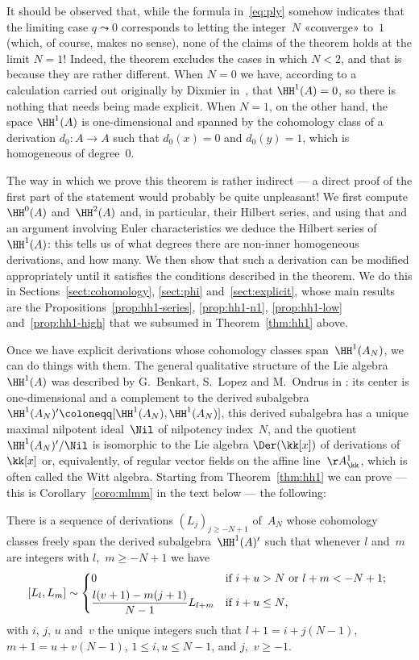 It should be observed that, while the formula in~\eqref{eq:ply} somehow
indicates that the limiting case $q\leadsto0$ corresponds to letting the
integer~$N$ «converge» to~$1$ (which, of course, makes no sense), none of
the claims of the theorem holds at the limit $N=1$! Indeed, the theorem
excludes the cases in which $N<2$, and that is because they are rather
different. When $N=0$ we have, according to a calculation carried out
originally by Dixmier in~\cite{Dixmier:2}, that $\HH^1(A)=0$, so there is
nothing that needs being made explicit. When $N=1$, on the other hand, the space
$\HH^1(A)$ is one-dimensional and spanned by the cohomology class of a
derivation $d_0:A\to A$ such that $d_0(x)=0$ and $d_0(y)=1$, which is
homogeneous of degree~$0$.

The way in which we prove this theorem is rather indirect --- a direct
proof of the first part of the statement would probably be quite
unpleasant! We first compute $\HH^0(A)$ and~$\HH^2(A)$ and, in particular,
their Hilbert series, and using that and an argument involving Euler
characteristics we deduce the Hilbert series of~$\HH^1(A)$: this tells us
of what degrees there are non-inner homogeneous derivations, and how many.
We then show that such a derivation can be modified appropriately until it
satisfies the conditions described in the theorem. We do this in
Sections~\ref{sect:cohomology}, \ref{sect:phi} and~\ref{sect:explicit},
whose main results are the Propositions~\ref{prop:hh1-series},
\ref{prop:hh1-n1}, \ref{prop:hh1-low} and~\ref{prop:hh1-high} that we
subsumed in Theorem~\ref{thm:hh1} above.

\bigskip

Once we have explicit derivations whose cohomology classes
span~$\HH^1(A_N)$, we can do things with them. The general qualitative
structure of the Lie algebra~$\HH^1(A)$ was described by G.~Benkart,
S.~Lopez and M.~Ondrus in \cite{BLO:3}: its center is one-dimensional and a
complement to the derived subalgebra
$\HH^1(A_N)'\coloneqq[\HH^1(A_N),\HH^1(A_N)]$, this derived subalgebra has
a unique maximal nilpotent ideal~$\Nil$ of nilpotency index~$N$, and the
quotient $\HH^1(A_N)'/\Nil$ is isomorphic to the Lie algebra $\Der(\kk[x])$
of derivations of~$\kk[x]$ or, equivalently, of regular vector fields on
the affine line~$\AA^1_\kk$, which is often called the Witt algebra.
Starting from Theorem~\ref{thm:hh1} we can prove --- this is
Corollary~\ref{coro:mlmm} in the text below --- the following:

\begin{Theorem}
There is a sequence of derivations $(L_j)_{j\geq-N+1}$ of~$A_N$ whose
cohomology classes freely span the derived subalgebra~$\HH^1(A)'$ such that
whenever $l$ and~$m$ are integers with $l$,~$m\geq-N+1$ we have
  \[ 
  [L_l, L_m] \sim
    \begin{dcases*}
    0 & if $i+u>N$ or $l+m<-N+1$; \\
    \frac{l(v+1)-m(j+1)}{N-1}L_{l+m} & if $i+u\leq N$,
    \end{dcases*}
  \]
with $i$, $j$, $u$ and~$v$ the unique integers such that
$l+1=i+j(N-1)$, $m+1=u+v(N-1)$, $1\leq i, u\leq N-1$, and
$j$,~$v\geq-1$. 
\end{Theorem}

